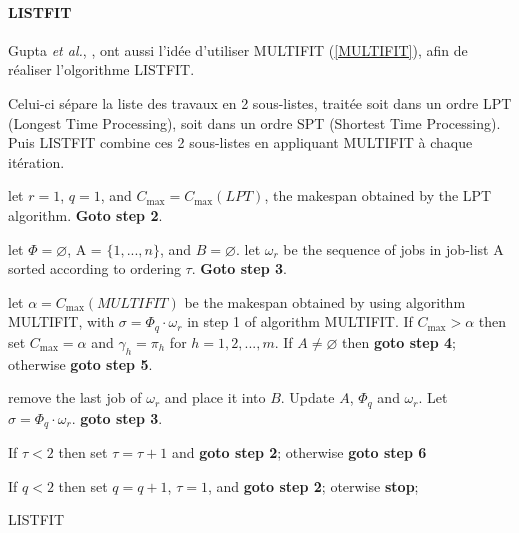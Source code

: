 \documentclass[a4paper,12pt]{report}
\theoremstyle{plain}				%
\theoremstyle{definition}				%
\begin{document}
\paragraph{LISTFIT}

Gupta \textit{et al.}, \cite{gupta2001listfit}, ont aussi l'idée
d'utiliser MULTIFIT (\ref{MULTIFIT}), afin de réaliser l'olgorithme
LISTFIT.

Celui-ci sépare la liste des travaux en 2 sous-listes, traitée soit
dans un ordre LPT (Longest Time Processing), soit dans un ordre SPT
(Shortest Time Processing).
Puis LISTFIT combine ces 2 sous-listes en appliquant MULTIFIT à chaque
itération.

\bigskip
\begin{algorithm}[H]
\DontPrintSemicolon
{}

let $r=1$, $q=1$, and $C_{\max}=C_{\max}(LPT)$, the makespan obtained
by the LPT algorithm.
\textbf{Goto step 2}.

\BlankLine %
let $\Phi = \varnothing$, A = $\{1,...,n\}$, and $B = \varnothing$.
let $\omega_r$ be the sequence of jobs in job-list A sorted according
to ordering $\tau$.
\textbf{Goto step 3}.

\BlankLine %
let $\alpha=C_{\max}(MULTIFIT)$ be the makespan obtained by using
algorithm MULTIFIT, with $\sigma = \Phi_q \cdot \omega_r$ in step 1 of
algorithm MULTIFIT.
If $C_{\max}>\alpha$ then set $C_{\max} = \alpha$ and
$\gamma_h = \pi_h$ for $h=1,2,...,m$.
If $A \neq \varnothing$ then \textbf{goto step 4}; otherwise
\textbf{goto step 5}.

\BlankLine %
remove the last job of $\omega_r$ and place it into $B$.
Update $A$, $\Phi_q$ and $\omega_r$.
Let $\sigma = \Phi_q \cdot \omega_r$.
\textbf{goto step 3}.

\BlankLine %
If {$\tau < 2$} then set $\tau = \tau + 1$ and \textbf{goto step 2};
otherwise \textbf{goto step 6}

\BlankLine %
If $q<2$ then set $q=q+1$, $\tau = 1$, and \textbf{goto step 2};
oterwise \textbf{stop}; 

\caption{LISTFIT\label{LISTFIT}}
\end{algorithm}
\end{document}
